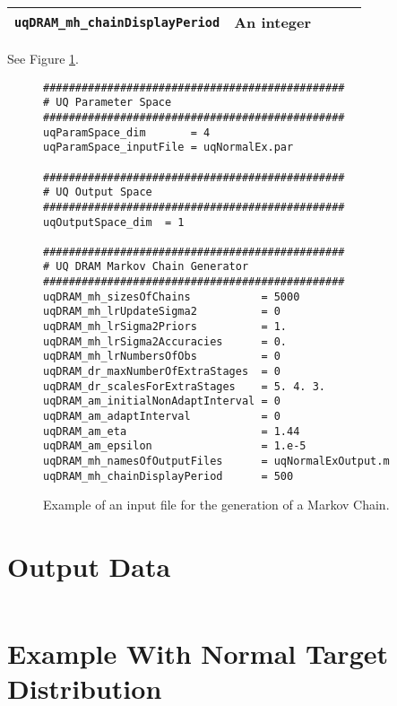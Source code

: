 \begin{sidewaystable}[h]
\begin{center}
\begin{tabular}{|l|c|c|c|c|}
\hline
\verb=uqDRAM_mh_chainDisplayPeriod=      & An integer                          &                                              &                                                  &               \\
\hline
\end{tabular}
\caption{Mapping between DRAM algorithm parameters in the input file of Figure \ref{fig-dram-input-file-ex} and the mathematical terms explained in Sections \ref{sc-intro-qoi} and \ref{sc-rmc-algs}.
}
\label{tab-dram-map}
\end{center}
\end{sidewaystable}

See Figure \ref{fig-dram-input-file-ex}.

\begin{figure}[h!]
\begin{verbatim}
###############################################
# UQ Parameter Space
###############################################
uqParamSpace_dim       = 4
uqParamSpace_inputFile = uqNormalEx.par

###############################################
# UQ Output Space
###############################################
uqOutputSpace_dim  = 1

###############################################
# UQ DRAM Markov Chain Generator
###############################################
uqDRAM_mh_sizesOfChains           = 5000
uqDRAM_mh_lrUpdateSigma2          = 0
uqDRAM_mh_lrSigma2Priors          = 1.
uqDRAM_mh_lrSigma2Accuracies      = 0.
uqDRAM_mh_lrNumbersOfObs          = 0
uqDRAM_dr_maxNumberOfExtraStages  = 0
uqDRAM_dr_scalesForExtraStages    = 5. 4. 3.
uqDRAM_am_initialNonAdaptInterval = 0
uqDRAM_am_adaptInterval           = 0
uqDRAM_am_eta                     = 1.44
uqDRAM_am_epsilon                 = 1.e-5
uqDRAM_mh_namesOfOutputFiles      = uqNormalExOutput.m
uqDRAM_mh_chainDisplayPeriod      = 500
\end{verbatim}
\caption{Example of an input file for the generation of a Markov Chain.
}
\label{fig-dram-input-file-ex}
\end{figure}

\section{Output Data}\label{sc-gmc-dram-output}
$~$\\

\clearpage

\section{Example With Normal Target Distribution}\label{sc-gmc-dram-normal-ex}


